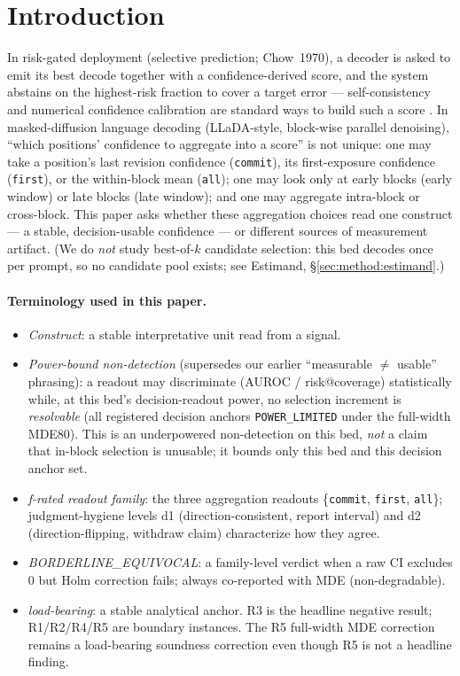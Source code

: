 \documentclass{article}
\begin{document}
\section{Introduction}
\label{sec:intro}

In risk-gated deployment (selective prediction; Chow~1970), a decoder is asked to emit
its best decode together with a confidence-derived score, and the system abstains on the
highest-risk fraction to cover a target error --- self-consistency and numerical confidence
calibration are standard ways to build such a score \cite{wang2023selfconsistency,
guo2017calibration}. In
masked-diffusion language decoding (LLaDA-style, block-wise parallel denoising), ``which
positions' confidence to aggregate into a score'' is not unique: one may take a position's
last revision confidence (\texttt{commit}), its first-exposure confidence (\texttt{first}),
or the within-block mean (\texttt{all}); one may look only at early blocks (early window) or
late blocks (late window); and one may aggregate intra-block or cross-block. This paper asks
whether these aggregation choices read one construct --- a stable, decision-usable confidence
--- or different sources of measurement artifact. (We do \emph{not} study best-of-$k$
candidate selection: this bed decodes once per prompt, so no candidate pool exists; see
Estimand, \S\ref{sec:method:estimand}.)

\paragraph{Terminology used in this paper.}
\begin{itemize}
  \item \emph{Construct}: a stable interpretative unit read from a signal.
  \item \emph{Power-bound non-detection} (supersedes our earlier ``measurable $\neq$ usable''
  phrasing): a readout may discriminate (AUROC / risk@coverage) statistically while, at this
  bed's decision-readout power, no selection increment is \emph{resolvable} (all registered
  decision anchors \texttt{POWER\_LIMITED} under the full-width MDE80). This is an
  underpowered non-detection on this bed, \emph{not} a claim that in-block selection is
  unusable; it bounds only this bed and this decision anchor set.
  \item \emph{f-rated readout family}: the three aggregation readouts \{\texttt{commit},
  \texttt{first}, \texttt{all}\}; judgment-hygiene levels d1 (direction-consistent,
  report interval) and d2 (direction-flipping, withdraw claim) characterize how they agree.
  \item \emph{BORDERLINE\_EQUIVOCAL}: a family-level verdict when a raw CI excludes 0 but
  Holm correction fails; always co-reported with MDE (non-degradable).
  \item \emph{load-bearing}: a stable analytical anchor. R3 is the headline negative
  result; R1/R2/R4/R5 are boundary instances. The R5 full-width MDE correction remains a
  load-bearing soundness correction even though R5 is not a headline finding.
\end{itemize}
\end{document}

